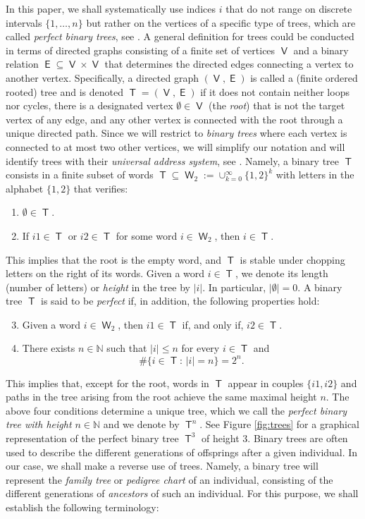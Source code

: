 \documentclass[reqno]{amsart}
\DeclareMathOperator{\Tree}{\mathsf{T}}
\DeclareMathOperator{\Vertices}{\mathsf{V}}
\DeclareMathOperator{\Edges}{\mathsf{E}}
\DeclareMathOperator{\Words}{\mathsf{W}}
\numberwithin{equation}{section}
\begin{document}
{In this paper, we shall systematically use indices $i$ that do not range on discrete intervals $\{1,\ldots,n\}$ but rather on the vertices of a specific type of trees, which are called \textit{perfect binary trees}, see \cite{R-11,W-85}. A general definition for trees could be conducted in terms of directed graphs consisting of a finite set of vertices $\Vertices$ and a binary relation $\Edges\subseteq \Vertices\times \Vertices$ that determines the directed edges connecting a vertex to another vertex. Specifically, a directed graph $(\Vertices,\Edges)$ is called a (finite ordered rooted) tree and is denoted $\Tree=(\Vertices,\Edges)$ if it does not contain neither loops nor cycles, there is a designated vertex $\emptyset\in \Vertices$ (the \textit{root}) that is not the target vertex of any edge, and any other vertex is connected with the root through a unique directed path. Since we will restrict to \textit{binary trees} where each vertex is connected to at most two other vertices, we will simplify our notation and will identify trees with their \textit{universal address system}, see \cite[Section 11.3.3]{R-11}. Namely, a binary tree $\Tree$ consists in a finite subset of words $\Tree\subseteq \Words_2:=\cup_{k=0}^\infty\{1,2\}^k$ with letters in the alphabet $\{1,2\}$ that verifies:
\begin{enumerate}
\item $\emptyset\in \Tree$.
\item If $i1\in \Tree$ or $i2\in \Tree$ for some word $i\in \Words_2$, then $i\in \Tree$.
\end{enumerate}
This implies that the root is the empty word, and $\Tree$ is stable under chopping letters on the right of its words. Given a word $i\in \Tree$, we denote its length (number of letters) or \textit{height} in the tree by $\vert i\vert$.  In particular, $\vert \emptyset\vert=0$. A binary tree $\Tree$ is said to be \textit{perfect} if, in addition, the following properties hold:
\begin{enumerate}
\setcounter{enumi}{2}
\item Given a word $i\in \Words_2$, then $i1\in \Tree$ if, and only if, $i2\in \Tree$. 
\item There exists $n\in \mathbb{N}$ such that $\vert i\vert \leq n$ for every $i\in \Tree$ and
$$\#\{i\in \Tree:\,\vert i\vert=n\}=2^n.$$
\end{enumerate}
This implies that, except for the root, words in $\Tree$ appear in couples $\{i1,i2\}$ and paths in the tree arising from the root achieve the same maximal height $n$. The above four conditions determine a unique tree, which we call the \textit{perfect binary tree with height $n\in \mathbb{N}$} and we denote by $\Tree^n$. See Figure \ref{fig:trees} for a graphical representation of the perfect binary tree $\Tree^3$ of height $3$. Binary trees are often used to describe the different generations of offsprings after a given individual. In our case, we shall make a reverse use of trees. Namely, a binary tree will represent the \textit{family tree} or \textit{pedigree chart} of an individual, consisting of the different generations of \textit{ancestors} of such an individual. For this purpose, we shall establish the following terminology:
}
\end{document}

